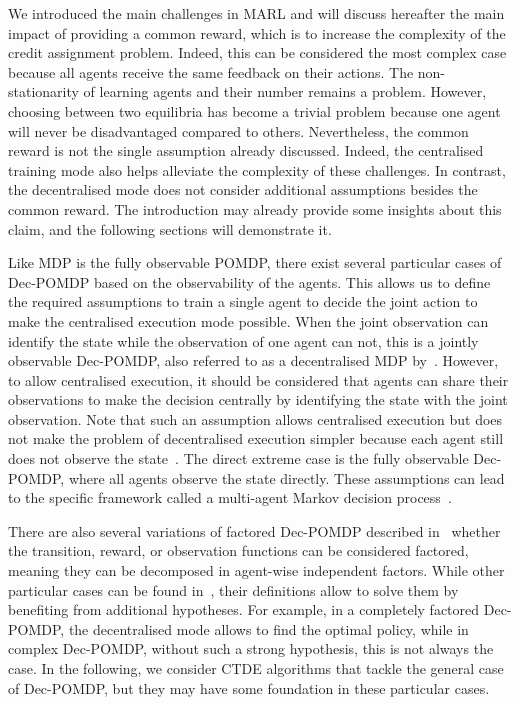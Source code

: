 We introduced the main challenges in MARL and will discuss hereafter the main impact of providing a common reward, which is to increase the complexity of the credit assignment problem.
Indeed, this can be considered the most complex case because all agents receive the same feedback on their actions.
The non-stationarity of learning agents and their number remains a problem.
However, choosing between two equilibria has become a trivial problem because one agent will never be disadvantaged compared to others.
Nevertheless, the common reward is not the single assumption already discussed.
Indeed, the centralised training mode also helps alleviate the complexity of these challenges.
In contrast, the decentralised mode does not consider additional assumptions besides the common reward.
The introduction may already provide some insights about this claim, and the following sections will demonstrate it.

Like MDP is the fully observable POMDP, there exist several particular cases of Dec-POMDP based on the observability of the agents.
This allows us to define the required assumptions to train a single agent to decide the joint action to make the centralised execution mode possible.
When the joint observation can identify the state while the observation of one agent can not, this is a jointly observable Dec-POMDP, also referred to as a decentralised MDP by~\cite{DecPomdp}.
However, to allow centralised execution, it should be considered that agents can share their observations to make the decision centrally by identifying the state with the joint observation.
Note that such an assumption allows centralised execution but does not make the problem of decentralised execution simpler because each agent still does not observe the state~\citep{bernstein2002complexity}.
The direct extreme case is the fully observable Dec-POMDP, where all agents observe the state directly.
These assumptions can lead to the specific framework called a multi-agent Markov decision process~\citep{boutilier1996planning}.

There are also several variations of factored Dec-POMDP described in~\citep{DecPomdp} whether the transition, reward, or observation functions can be considered factored, meaning they can be decomposed in agent-wise independent factors.
While other particular cases can be found in~\citep{DecPomdp}, their definitions allow to solve them by benefiting from additional hypotheses.
For example, in a completely factored Dec-POMDP, the decentralised mode allows to find the optimal policy, while in complex Dec-POMDP, without such a strong hypothesis, this is not always the case.
In the following, we consider CTDE algorithms that tackle the general case of Dec-POMDP, but they may have some foundation in these particular cases.

